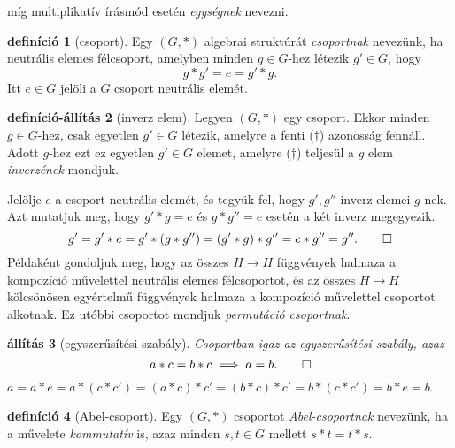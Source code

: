 \documentclass[9pt, a4paper, showtrims]{memoir}
\makeatletter
\renewenvironment{proof}[1][\proofname]
    {\par\pushQED{\qed}%
    \normalfont \topsep6\p@\@plus6\p@\relax
    \trivlist
    \item[\hskip\labelsep
        \itshape
    #1\@addpunct{:}]\ignorespaces}
    {\popQED\endtrivlist\@endpefalse}
\theoremstyle{plain}
\newtheorem{proposition}{állítás}[chapter]
\theoremstyle{remark}
\theoremstyle{definition}
\newtheorem{definition}[proposition]{definíció}
\newtheorem{defprop}[proposition]{definíció-állítás}
\makeatother
\begin{document}
míg multiplikatív írásmód esetén \emph{egységnek} nevezni.
\begin{definition}[csoport]
	Egy $\left( G,\ast \right)$ algebrai struktúrát \emph{csoportnak} nevezünk,
	ha neutrális elemes félcsoport, amelyben minden $g\in G$-hez létezik $g'\in G$, hogy
	\[
		g\ast g'=e=g'\ast g.\tag{\dag}
	\]
	Itt $e\in G$ jelöli a $G$ csoport neutrális elemét.
\end{definition}
\begin{defprop}[inverz elem]
	Legyen $\left( G,\ast \right)$ egy csoport.
	Ekkor minden $g\in G$-hez, csak egyetlen $g'\in G$ létezik,
	amelyre a fenti ($\dag$) azonosság fennáll.
	Adott $g$-hez ezt ez egyetlen $g'\in G$ elemet,
	amelyre ($\dag$) teljesül a $g$ elem \emph{inverzének} mondjuk.
\end{defprop}
\begin{proof}
	Jelölje $e$ a csoport neutrális elemét,
	és tegyük fel, hogy $g',g''$ inverz elemei $g$-nek.
	Azt mutatjuk meg, hogy $g'\ast g=e$ és $g\ast g''=e$ esetén a két inverz megegyezik.
	\[
		g'=g'\ast e=
		g'\ast\left( g\ast g'' \right)=
		\left(g'\ast g\right)\ast g'' =
		e\ast g''=g''.\qedhere
	\]
\end{proof}
Példaként gondoljuk meg, hogy az összes $H\to H$ függvények halmaza a kompozíció művelettel
neutrális elemes félcsoportot,
és az összes $H\to H$ kölcsönösen egyértelmű függvények halmaza a kompozíció művelettel csoportot alkotnak.
Ez utóbbi csoportot mondjuk \emph{permutáció csoportnak}.
\begin{proposition}[egyszerűsítési szabály]
	Csoportban igaz az egyszerűsítési szabály, azaz
	\[
		a\ast c=b\ast c\implies a=b.\qedhere
	\]
\end{proposition}
\begin{proof}
	\begin{math}
		a=a\ast e
		=
		a\ast \left( c\ast c'\right)=
		\left( a\ast c \right)\ast c'=
		\left( b\ast c \right)\ast c'=
		b\ast\left( c\ast c' \right)=
		b\ast e=
		b.
	\end{math}
\end{proof}
\begin{definition}[Abel-csoport]
	Egy $\left( G,\ast \right)$ csoportot \emph{Abel-csoportnak} nevezünk,
	ha a művelete \emph{kommutatív} is,
	azaz minden $s,t\in G$ mellett $s\ast t=t\ast s$.
\end{definition}
\end{document}
